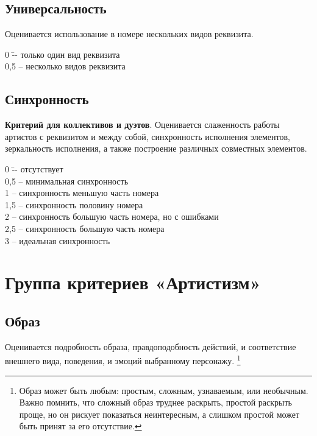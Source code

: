 \documentclass[12pt]{article}
\begin{document}
\subsection{Универсальность} 
Оценивается использование в номере нескольких видов реквизита.

\begin{tabbing}
0\hspace{0.8em}  \= -- только один вид реквизита\\
0,5 \>-- несколько видов реквизита\\
\end{tabbing}


\subsection{Синхронность}
\textbf{Критерий для коллективов и дуэтов}. Оценивается слаженность работы артистов с реквизитом и между собой, синхронность исполнения элементов, зеркальность исполнения, а также построение различных совместных элементов.

\begin{tabbing}
0\hspace{0.8em}  \= -- отсутствует\\
0,5 \>-- минимальная синхронность \\
1 \>-- синхронность меньшую часть номера\\
1,5 \>-- синхронность половину номера\\
2 \>-- синхронность большую часть номера, но с ошибками\\
2,5 -- синхронность большую часть номера\\
3 \>-- идеальная синхронность
\end{tabbing}


\section{Группа критериев «Артистизм»}

\subsection{Образ} 
Оценивается подробность образа, правдоподобность действий, и соответствие внешнего вида, поведения, и эмоций выбранному персонажу.
\footnote{Образ может быть любым: простым, сложным, узнаваемым, или необычным. Важно помнить, что сложный образ труднее раскрыть, простой раскрыть проще, но он рискует показаться неинтересным, а слишком простой может быть принят за его отсутствие.}
\end{document}
